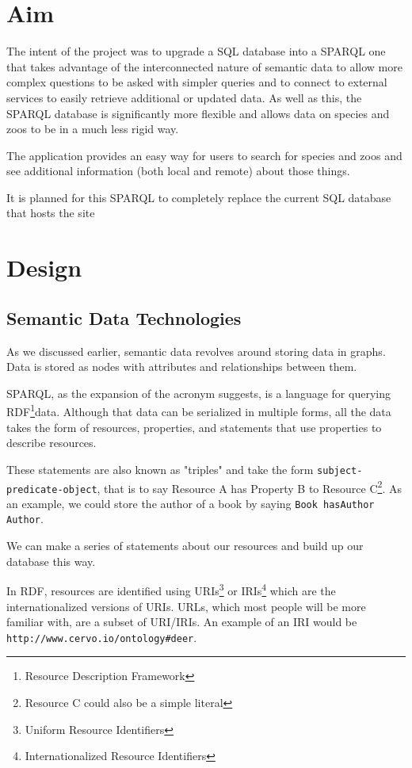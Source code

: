 \documentclass[a4paper]{article}
\begin{document}
\section{Aim}

The intent of the project was to upgrade a SQL database into a SPARQL one that takes advantage of the interconnected nature of semantic data to allow more complex questions to be asked with simpler queries and to connect to external services to easily retrieve additional or updated data. As well as this, the SPARQL database is significantly more flexible and allows data on species and zoos to be in a much less rigid way.


The application provides an easy way for users to search for species and zoos and see additional information (both local and remote) about those things.

It is planned for this SPARQL to completely replace the current SQL database that hosts the site

\section{Design}

\subsection{Semantic Data Technologies}
As we discussed earlier, semantic data revolves around storing data in graphs. Data is stored as nodes with attributes and relationships between them. 

SPARQL, as the expansion of the acronym suggests, is a language for querying RDF\footnote{Resource Description Framework}data. Although that data can be serialized in multiple forms, all the data takes the form of resources, properties, and statements that use properties to describe resources.

These statements are also known as "triples" and take the form \texttt{subject-predicate-object}, that is to say Resource A has Property B to Resource C\footnote{Resource C could also be a simple literal}. As an example, we could store the author of a book by saying \texttt{Book hasAuthor Author}. 

We can make a series of statements about our resources and build up our database this way.

In RDF, resources are identified using URIs\footnote{Uniform Resource Identifiers} or IRIs\footnote{Internationalized Resource Identifiers} which are the internationalized versions of URIs. URLs, which most people will be more familiar with, are a subset of URI/IRIs. An example of an IRI would be \verb|http://www.cervo.io/ontology#deer|\autocite{Smith2004}.
\end{document}
